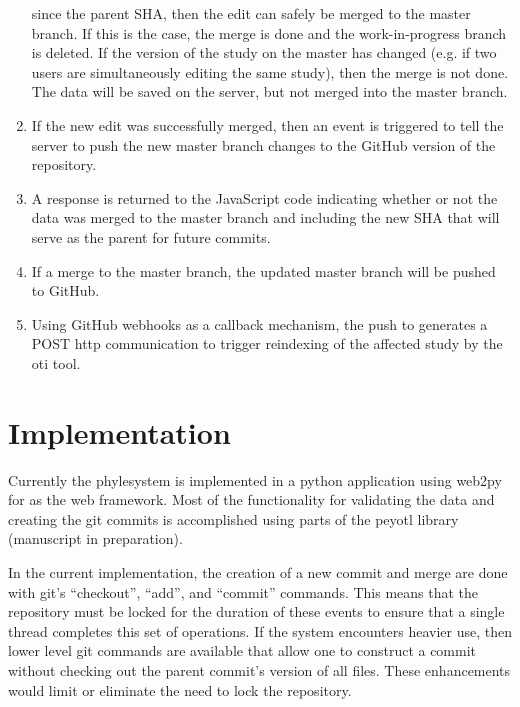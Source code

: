 \documentclass{bioinfo}
\newcommand{\ps}{phylesystem\xspace}
\newcommand{\js}{JavaScript\xspace}
\begin{document}
\begin{methods}
\begin{enumerate}
        since the parent SHA, then the edit can safely be merged to the master branch.
        If this is the case, the merge is done and the work-in-progress branch is deleted.
        If the version of the study on the master has changed (e.g. if two users are simultaneously editing the same study),
        then the merge is not done. The data will be saved on the server, but not merged into the master branch.
    \item\label{gitTriggerPushStep}  If the new edit was successfully merged, then an event is triggered to tell the server to push the new master branch changes to the GitHub version
        of the repository.
    \item\label{respondStep} A response is returned to the \js code indicating whether or not the data was 
        merged to the master branch and including the new SHA that will serve as the parent for future commits.
    \item\label{pushStep}  If a merge to the master branch, the updated master branch will be pushed to GitHub.
    \item\label{webHookStep} Using GitHub webhooks as a callback mechanism, the push to generates a POST http communication to trigger reindexing
        of the affected study by the oti tool.
\end{enumerate}

\section{Implementation}
Currently the \ps is implemented in a python application using web2py for as the web framework.
Most of the functionality for validating the data and creating the git commits is accomplished using
    parts of the peyotl library (manuscript in preparation).

In the current implementation, the creation of a new commit and merge are done with git's ``checkout'', ``add'', and ``commit'' commands.
This means that the repository must be locked for the duration of these events 
    to ensure that a single thread completes this set of operations.
If the system encounters heavier use, then lower level git commands 
    are available that allow one to construct a commit without checking out
    the parent commit's version of all files.
These enhancements would limit or eliminate the need to lock the repository.

\end{methods}
\end{document}
